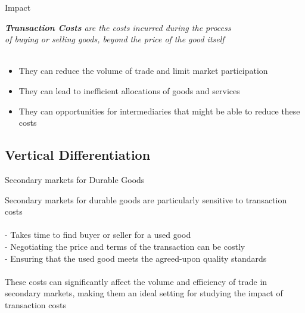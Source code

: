 \documentclass[aspectratio=169]{beamer}  %
\begin{document}
\begin{frame}{Impact}
\begin{spacing}{1.5}  
{\small
\textit{\textbf{Transaction Costs} are the costs incurred during the process\\ of buying or selling goods, beyond the price of the good itself}\\
\quad\\
    \begin{itemize}
        \item They can reduce the volume of trade and limit market participation
        \item They can lead to inefficient allocations of goods and services
        \item They can opportunities for intermediaries that might be able to reduce these costs
    \end{itemize}}


\end{spacing}
\end{frame}

\subsection{Vertical Differentiation}

\begin{frame}{Secondary markets for Durable Goods}
\begin{spacing}{1.5}  
{\small
{Secondary markets for durable goods are particularly sensitive to transaction costs}\\
\quad\\
- Takes time to find buyer or seller for a used good\\
- Negotiating the price and terms of the transaction can be costly\\
- Ensuring that the used good meets the agreed-upon quality standards\\
\quad\\
These costs can significantly affect the volume and efficiency of trade in secondary markets, making them an ideal setting for studying the impact of transaction costs}
\end{spacing}
\end{frame}
\end{document}
